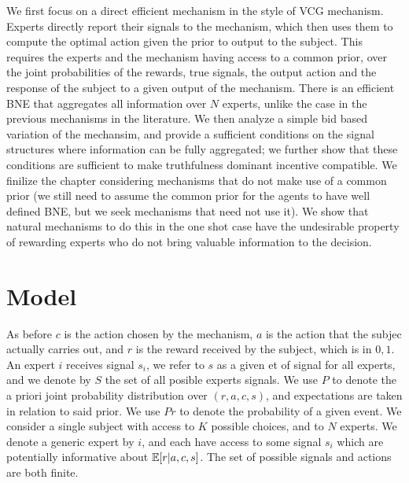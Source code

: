 We first focus on a direct efficient mechanism in the style of VCG mechanism. Experts directly report their signals to the mechanism, which then uses them to compute the optimal action given the prior to output to the subject. This requires  the experts and the mechanism having access to a common prior, over the joint probabilities of the rewards, true signals, the output action and the response of the subject to a given output of the mechanism. There is an efficient BNE that aggregates all information over $N$ experts, unlike the case in the previous mechanisms in the literature.
We then analyze a simple bid based variation of the mechansim, and provide a sufficient conditions on the signal structures where information can be fully aggregated; we further show that these conditions are sufficient to make truthfulness dominant incentive compatible.  
We finilize the chapter considering mechanisms that do not make use of a common prior (we still need to assume the common prior for the agents to have well defined BNE, but we seek mechanisms that need not use it). We show that natural mechanisms to do this in the one shot case have the undesirable property of rewarding experts who do not bring valuable information to the decision.

\section{Model}


As before $c$ is the action chosen by the mechanism, $a$ is the action that the subjec actually carries out, and $r$ is the reward received by the subject, which is in ${0,1}$. An expert $i$ receives signal $s_i$, we refer to $s$ as a given et of signal for all experts, and we denote by $S$ the set of all posible experts signals.
We use $P$ to denote the a priori joint probability distribution over $(r,a,c,s)$, and expectations are taken in relation to said prior.
We use $Pr$ to denote the probability of a given event.
We consider a single subject with access to $K$ possible choices, and to $N$ experts. We denote a generic expert by $i$, and each have access to some signal $s_i$ which are potentially informative about $\operatorname*{\mathbb E}[r|a,c,s]$. The set of possible signals and actions are both finite.


